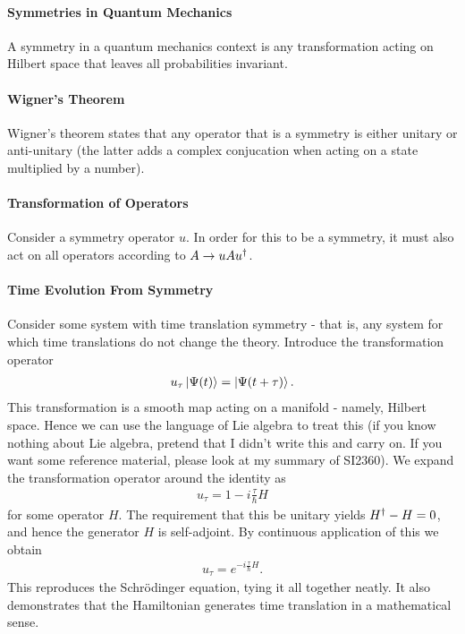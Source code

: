 \paragraph{Symmetries in Quantum Mechanics}
A symmetry in a quantum mechanics context is any transformation acting on Hilbert space that leaves all probabilities invariant.

\paragraph{Wigner's Theorem}
Wigner's theorem states that any operator that is a symmetry is either unitary or anti-unitary (the latter adds a complex conjucation when acting on a state multiplied by a number).

\paragraph{Transformation of Operators}
Consider a symmetry operator $u$. In order for this to be a symmetry, it must also act on all operators according to $A\to uAu^{\dagger}$.

\paragraph{Time Evolution From Symmetry}
Consider some system with time translation symmetry - that is, any system for which time translations do not change the theory. Introduce the transformation operator
\begin{align*}
	u_{\tau}\ket{\Psi(t)} = \ket{\Psi(t + \tau)}.
\end{align*}
This transformation is a smooth map acting on a manifold - namely, Hilbert space. Hence we can use the language of Lie algebra to treat this (if you know nothing about Lie algebra, pretend that I didn't write this and carry on. If you want some reference material, please look at my summary of SI2360). We expand the transformation operator around the identity as
\begin{align*}
	u_{\tau} = 1 - i\frac{\tau}{\hbar}H
\end{align*}
for some operator $H$. The requirement that this be unitary yields $H^{\dagger} - H = 0$, and hence the generator $H$ is self-adjoint. By continuous application of this we obtain
\begin{align*}
	u_{\tau} = e^{-i\frac{\tau}{\hbar}H}.
\end{align*}
This reproduces the Schrödinger equation, tying it all together neatly. It also demonstrates that the Hamiltonian generates time translation in a mathematical sense.

